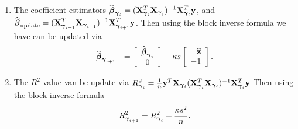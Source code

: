 \begin{enumerate}
	\item
	The coefficient estimators 
	$ 
	\displaystyle \widehat{{\boldsymbol \beta}}_{{\boldsymbol \gamma}_{i}} = ({\bf X}_{{\boldsymbol \gamma}_{i}}^T{\bf X}_{{\boldsymbol \gamma}_{i}})^{-1}{\bf X}_{{\boldsymbol \gamma}_{i}}^T{\bf y}$,
	and $\displaystyle \widehat{{\boldsymbol \beta}}_{\mbox{\scriptsize update}}  = ({\bf X}_{{\boldsymbol \gamma}_{i+1}}^T{\bf X}_{{\boldsymbol \gamma}_{i+1}})^{-1}{\bf X}_{{\boldsymbol \gamma}_{i+1}}^T{\bf y}$.  
	Then using the block inverse formula we have
	can be updated via
	$$
	\begin{array}{rl}
	\displaystyle \widehat{{\boldsymbol \beta}}_{{\boldsymbol \gamma}_{i+1}}
	& \displaystyle 
	= \left[ \begin{array}{c}
	\widehat{{\boldsymbol \beta}}_{{\boldsymbol \gamma}_{i}} \\
	0 
	\end{array} \right] - \kappa s  \left[ \begin{array}{r}
	\widehat{{\bf z}}   \\
	- 1
	\end{array} \right].
	\end{array} 
	$$
	
	\item The $R^2$ value van be update via
	$R_{\vgamma_{i}}^2 = \tfrac{1}{n} \vy^T\mX_{\vgamma_{i}}(\mX_{\vgamma_{i}}^T\mX_{\vgamma_{i}})^{-1}\mX_{\vgamma_{i}}^T\vy$
	Then using the block inverse formula
	$$
	\begin{array}{rl}
	\ds 
	R_{\vgamma_{i+1}}^2 
	= R_{\vgamma_{i}}^2
	+ \frac{\kappa s^2}{n}.
	
	\end{array}
	$$
	
\end{enumerate}

